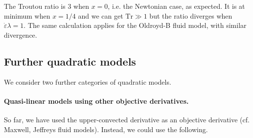 \documentclass{jknotes}
\newcommand{\deps}{\dot{\varepsilon}}
\begin{document}
The Troutou ratio is $3$ when $x=0$, i.e. the Newtonian case, as expected. It
is at minimum when $x = 1/4$ and we can get $\text{Tr} \gg 1$ but
the ratio diverges when $\deps \lambda = 1$. The same calculation applies for
the Oldroyd-B fluid model, with similar divergence.

\subsection{Further quadratic models}
We consider two further categories of quadratic models.
\paragraph{Quasi-linear models using other objective derivatives.} So far, we
have used the upper-convected derivative as an objective derivative (cf.
Maxwell, Jeffreys fluid models). Instead, we could use the following.
\end{document}
